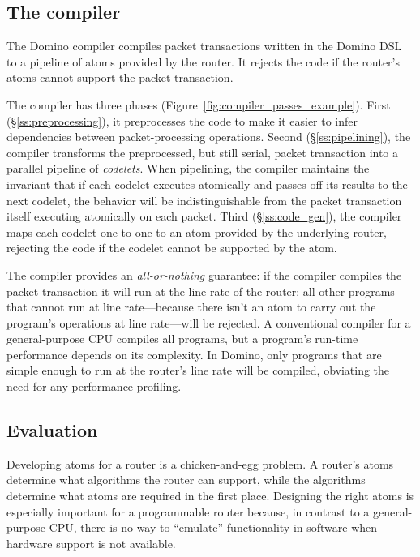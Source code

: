 \subsection{The compiler} The Domino compiler compiles packet transactions
written in the Domino DSL to a pipeline of atoms provided by the router. It
rejects the code if the router's atoms cannot support the packet transaction.

The compiler has three phases (Figure~\ref{fig:compiler_passes_example}). First
(\S\ref{ss:preprocessing}), it preprocesses the code to make it easier to infer
dependencies between packet-processing operations. Second
(\S\ref{ss:pipelining}), the compiler transforms the preprocessed, but still
serial, packet transaction into a parallel pipeline of {\em codelets}.  When
pipelining, the compiler maintains the invariant that if each codelet executes
atomically and passes off its results to the next codelet, the behavior will be
indistinguishable from the packet transaction itself executing atomically on
each packet. Third (\S\ref{ss:code_gen}), the compiler maps each codelet
one-to-one to an atom provided by the underlying router, rejecting the code if
the codelet cannot be supported by the atom.

The compiler provides an {\em all-or-nothing} guarantee: if the compiler
compiles the packet transaction it will run at the line rate of the router; all
other programs that cannot run at line rate---because there isn't an atom to
carry out the program's operations at line rate---will be rejected. A
conventional compiler for a general-purpose CPU compiles all programs, but a
program's run-time performance depends on its complexity. In Domino, only
programs that are simple enough to run at the router's line rate will be
compiled, obviating the need for any performance profiling.

\subsection{Evaluation}
Developing atoms for a router is a chicken-and-egg problem. A router's atoms
determine what algorithms the router can support, while the algorithms
determine what atoms are required in the first place. Designing the right atoms
is especially important for a programmable router because, in contrast to a
general-purpose CPU, there is no way to ``emulate'' functionality in software
when hardware support is not available.

